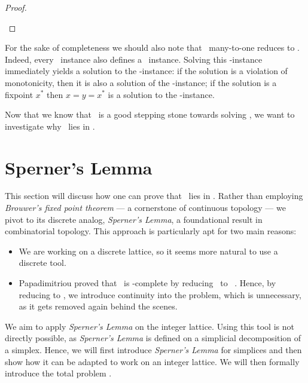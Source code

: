\begin{proof}
\begin{case}{3}
	\end{case}
\end{proof}

For the sake of completeness we should also note that \Tarskistar\ many-to-one reduces to \Tarski. Indeed, every \Tarskistar\ instance also defines a \Tarski\ instance. Solving this \Tarski-instance immediately yields a solution to the \Tarskistar-instance: if the solution is a violation of monotonicity, then it is also a solution of the \Tarski-instance; if the solution is a fixpoint $x^*$ then $x=y=x^*$ is a solution to the \Tarskistar-instance.

Now that we know that \Tarskistar\ is a good stepping stone towards solving \Tarski, we want to investigate why \Tarskistar\ lies in \PPAD.

\section{Sperner's Lemma}

This section will discuss how one can prove that \Tarskistar\ lies in \PPAD. Rather than employing \textit{Brouwer's fixed point theorem} --- a cornerstone of continuous topology --- we pivot to its discrete analog, \textit{Sperner's Lemma}, a foundational result in combinatorial topology. This approach is particularly apt for two main reasons:
\begin{itemize}
	\item We are working on a discrete lattice, so it seems more natural to use a discrete tool.
	\item Papadimitriou proved that \Brouwer\ is \PPAD-complete by reducing \Brouwer\ to \Sperner\ . Hence, by reducing to \Brouwer, we introduce continuity into the problem, which is unnecessary, as it gets removed again behind the scenes.
\end{itemize}

We aim to apply \textit{Sperner's Lemma} on the integer lattice. Using this tool is not directly possible, as \textit{Sperner's Lemma} is defined on a simplicial decomposition of a simplex. Hence, we will first introduce \textit{Sperner's Lemma} for simplices and then show how it can be adapted to work on an integer lattice. We will then formally introduce the total problem \Sperner.

